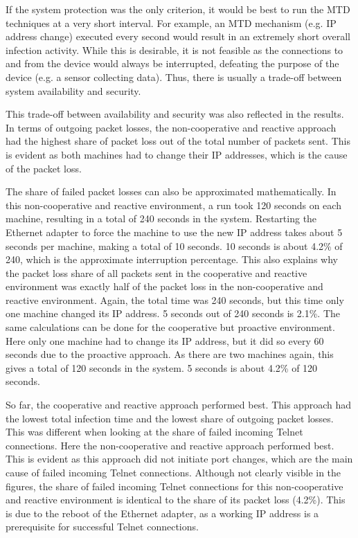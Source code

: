 If the system protection was the only criterion, it would be best to run the MTD techniques at a very short interval. For example, an MTD mechanism (e.g. IP address change) executed every second would result in an extremely short overall infection activity. While this is desirable, it is not feasible as the connections to and from the device would always be interrupted, defeating the purpose of the device (e.g. a sensor collecting data). Thus, there is usually a trade-off between system availability and security. 

This trade-off between availability and security was also reflected in the results. In terms of outgoing packet losses, the non-cooperative and reactive approach had the highest share of packet loss out of the total number of packets sent. This is evident as both machines had to change their IP addresses, which is the cause of the packet loss. 

The share of failed packet losses can also be approximated mathematically. In this non-cooperative and reactive environment, a run took 120 seconds on each machine, resulting in a total of 240 seconds in the system. Restarting the Ethernet adapter to force the machine to use the new IP address takes about 5 seconds per machine, making a total of 10 seconds. 10 seconds is about 4.2\% of 240, which is the approximate interruption percentage. This also explains why the packet loss share of all packets sent in the cooperative and reactive environment was exactly half of the packet loss in the non-cooperative and reactive environment. Again, the total time was 240 seconds, but this time only one machine changed its IP address. 5 seconds out of 240 seconds is 2.1\%. The same calculations can be done for the cooperative but proactive environment. Here only one machine had to change its IP address, but it did so every 60 seconds due to the proactive approach. As there are two machines again, this gives a total of 120 seconds in the system. 5 seconds is about 4.2\% of 120 seconds. 

So far, the cooperative and reactive approach performed best. This approach had the lowest total infection time and the lowest share of outgoing packet losses. This was different when looking at the share of failed incoming Telnet connections. Here the non-cooperative and reactive approach performed best. This is evident as this approach did not initiate port changes, which are the main cause of failed incoming Telnet connections. Although not clearly visible in the figures, the share of failed incoming Telnet connections for this non-cooperative and reactive environment is identical to the share of its packet loss (4.2\%). This is due to the reboot of the Ethernet adapter, as a working IP address is a prerequisite for successful Telnet connections. 


